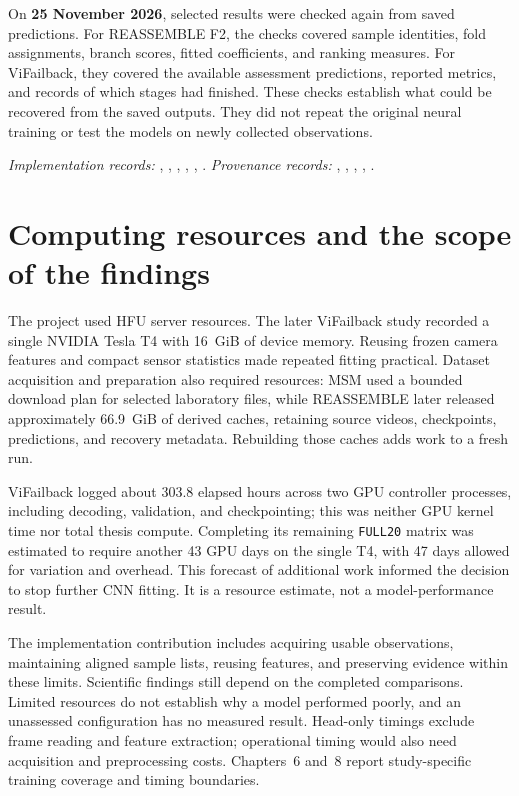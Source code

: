 On \textbf{25 November 2026}, selected results were checked again from saved
predictions. For REASSEMBLE F2, the checks covered sample identities, fold assignments,
branch scores, fitted coefficients, and ranking measures. For ViFailback, they covered
the available assessment predictions, reported metrics, and records of which stages had
finished. These checks establish what could be recovered from the saved outputs. They
did not repeat the original neural training or test the models on newly collected
observations.

\noindent\textit{Implementation records:} , ,
, , ,
. \textit{Provenance records:} ,
, , , .

\section{Computing resources and the scope of the findings}
\label{sec:ch4-boundaries}

The project used HFU server resources. The later ViFailback study recorded a single
NVIDIA Tesla T4 with 16~GiB of device memory. Reusing frozen camera features and compact
sensor statistics made repeated fitting practical. Dataset acquisition and preparation
also required resources: MSM used a bounded download plan for selected laboratory files,
while REASSEMBLE later released approximately 66.9~GiB of derived caches, retaining
source videos, checkpoints, predictions, and recovery metadata. Rebuilding those caches
adds work to a fresh run.

ViFailback logged about 303.8 elapsed hours across two GPU controller processes,
including decoding, validation, and checkpointing; this was neither GPU kernel time nor
total thesis compute. Completing its remaining \texttt{FULL20} matrix was estimated to
require another 43 GPU days on the single T4, with 47 days allowed for variation and
overhead. This forecast of additional work informed the decision to stop further CNN
fitting. It is a resource estimate, not a model-performance result.

The implementation contribution includes acquiring usable observations, maintaining
aligned sample lists, reusing features, and preserving evidence within these limits.
Scientific findings still depend on the completed comparisons. Limited resources do not
establish why a model performed poorly, and an unassessed configuration has no measured
result. Head-only timings exclude frame reading and feature extraction; operational
timing would also need acquisition and preprocessing costs. Chapters~6 and~8 report
study-specific training coverage and timing boundaries.

